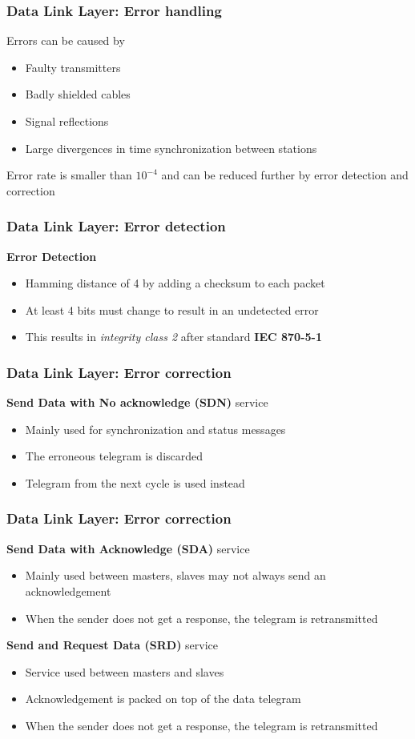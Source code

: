 \documentclass{beamer}
\begin{document}
\begin{frame}
  \frametitle{Data Link Layer: Error handling}
  Errors can be caused by
  \begin{itemize}
    \item Faulty transmitters
    \item Badly shielded cables
    \item Signal reflections
    \item Large divergences in time synchronization between stations
  \end{itemize}
  Error rate is smaller than $10^{-4}$ and can be reduced further by error detection and
  correction
\end{frame}

\begin{frame}
  \frametitle{Data Link Layer: Error detection}
  \textbf{Error Detection}
  \begin{itemize}
    \item Hamming distance of 4 by adding a checksum to each packet
    \item At least 4 bits must change to result in an undetected error
    \item This results in \textit{integrity class 2} after standard \textbf{IEC 870-5-1}
  \end{itemize}
\end{frame}

\begin{frame}
  \frametitle{Data Link Layer: Error correction}
  \textbf{Send Data with No acknowledge (SDN)} service
  \begin{itemize}
    \item Mainly used for synchronization and status messages
    \item The erroneous telegram is discarded
    \item Telegram from the next cycle is used instead
  \end{itemize}
\end{frame}

\begin{frame}
  \frametitle{Data Link Layer: Error correction}
  \textbf{Send Data with Acknowledge (SDA)} service
  \begin{itemize}
    \item Mainly used between masters, slaves may not always send an acknowledgement
    \item When the sender does not get a response, the telegram is retransmitted
  \end{itemize}

  \vspace{10pt}
  \textbf{Send and Request Data (SRD)} service
  \begin{itemize}
    \item Service used between masters and slaves
    \item Acknowledgement is packed on top of the data telegram
    \item When the sender does not get a response, the telegram is retransmitted
  \end{itemize}
\end{frame}
\end{document}
